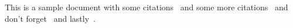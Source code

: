 \documentclass[12pt,a4paper]{article}
\begin{document}
This is a sample document with some citations~\cite{macaw,parrot}
and some more citations~\cite{duck2018,duck2016} and don't
forget~\cite{ing,parrot2012} and lastly~\cite{quackalot}.

\printunsrtglossary[type=contributors,style=altlist]



\end{document}
